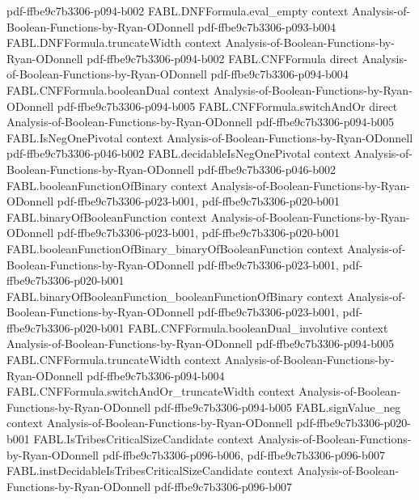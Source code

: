 \begin{theorem}
  {pdf-ffbe9c7b3306-p094-b002}
\proofstep
  {FABL.DNFFormula.eval_empty}
  {context}
  {Analysis-of-Boolean-Functions-by-Ryan-ODonnell}
  {pdf-ffbe9c7b3306-p093-b004}
\proofstep
  {FABL.DNFFormula.truncateWidth}
  {context}
  {Analysis-of-Boolean-Functions-by-Ryan-ODonnell}
  {pdf-ffbe9c7b3306-p094-b002}
\proofstep
  {FABL.CNFFormula}
  {direct}
  {Analysis-of-Boolean-Functions-by-Ryan-ODonnell}
  {pdf-ffbe9c7b3306-p094-b004}
\proofstep
  {FABL.CNFFormula.booleanDual}
  {context}
  {Analysis-of-Boolean-Functions-by-Ryan-ODonnell}
  {pdf-ffbe9c7b3306-p094-b005}
\proofstep
  {FABL.CNFFormula.switchAndOr}
  {direct}
  {Analysis-of-Boolean-Functions-by-Ryan-ODonnell}
  {pdf-ffbe9c7b3306-p094-b005}
\proofstep
  {FABL.IsNegOnePivotal}
  {context}
  {Analysis-of-Boolean-Functions-by-Ryan-ODonnell}
  {pdf-ffbe9c7b3306-p046-b002}
\proofstep
  {FABL.decidableIsNegOnePivotal}
  {context}
  {Analysis-of-Boolean-Functions-by-Ryan-ODonnell}
  {pdf-ffbe9c7b3306-p046-b002}
\proofstep
  {FABL.booleanFunctionOfBinary}
  {context}
  {Analysis-of-Boolean-Functions-by-Ryan-ODonnell}
  {pdf-ffbe9c7b3306-p023-b001,
    pdf-ffbe9c7b3306-p020-b001}
\proofstep
  {FABL.binaryOfBooleanFunction}
  {context}
  {Analysis-of-Boolean-Functions-by-Ryan-ODonnell}
  {pdf-ffbe9c7b3306-p023-b001,
    pdf-ffbe9c7b3306-p020-b001}
\proofstep
  {FABL.booleanFunctionOfBinary_binaryOfBooleanFunction}
  {context}
  {Analysis-of-Boolean-Functions-by-Ryan-ODonnell}
  {pdf-ffbe9c7b3306-p023-b001,
    pdf-ffbe9c7b3306-p020-b001}
\proofstep
  {FABL.binaryOfBooleanFunction_booleanFunctionOfBinary}
  {context}
  {Analysis-of-Boolean-Functions-by-Ryan-ODonnell}
  {pdf-ffbe9c7b3306-p023-b001,
    pdf-ffbe9c7b3306-p020-b001}
\proofstep
  {FABL.CNFFormula.booleanDual_involutive}
  {context}
  {Analysis-of-Boolean-Functions-by-Ryan-ODonnell}
  {pdf-ffbe9c7b3306-p094-b005}
\proofstep
  {FABL.CNFFormula.truncateWidth}
  {context}
  {Analysis-of-Boolean-Functions-by-Ryan-ODonnell}
  {pdf-ffbe9c7b3306-p094-b004}
\proofstep
  {FABL.CNFFormula.switchAndOr_truncateWidth}
  {context}
  {Analysis-of-Boolean-Functions-by-Ryan-ODonnell}
  {pdf-ffbe9c7b3306-p094-b005}
\proofstep
  {FABL.signValue_neg}
  {context}
  {Analysis-of-Boolean-Functions-by-Ryan-ODonnell}
  {pdf-ffbe9c7b3306-p020-b001}
\proofstep
  {FABL.IsTribesCriticalSizeCandidate}
  {context}
  {Analysis-of-Boolean-Functions-by-Ryan-ODonnell}
  {pdf-ffbe9c7b3306-p096-b006,
    pdf-ffbe9c7b3306-p096-b007}
\proofstep
  {FABL.instDecidableIsTribesCriticalSizeCandidate}
  {context}
  {Analysis-of-Boolean-Functions-by-Ryan-ODonnell}
  {pdf-ffbe9c7b3306-p096-b007}
\proofstep

\end{theorem}
